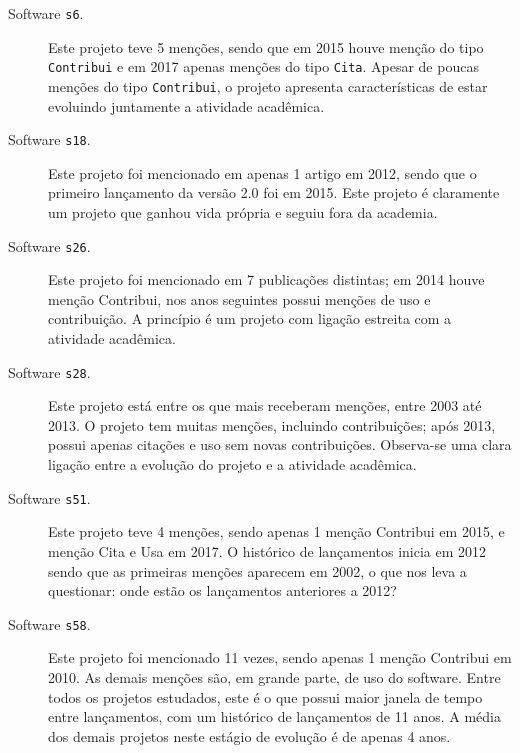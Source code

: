 
\begin{description}

  \item[Software \texttt{s6}.]
    Este projeto teve 5 menções, sendo que em 2015 houve menção do tipo \texttt{Contribui} 
    e em 2017 apenas menções do tipo \texttt{Cita}. 
    Apesar de poucas menções do tipo \texttt{Contribui},
    o projeto apresenta características de estar evoluindo juntamente a atividade
    acadêmica.

  \item[Software \texttt{s18}.]
    Este projeto foi mencionado em apenas 1 artigo em 2012, sendo que o
    primeiro lançamento da versão 2.0 foi em 2015. Este projeto é claramente um
    projeto que ganhou vida própria e seguiu fora da academia.

  \item[Software \texttt{s26}.]
    Este projeto foi mencionado em 7 publicações distintas; em 2014 houve
    menção Contribui, nos anos seguintes possui menções de uso e contribuição.
    A princípio é um projeto com ligação estreita com a atividade acadêmica.

  \item[Software \texttt{s28}.]
    Este projeto está entre os que mais receberam menções, entre 2003 até 2013.
    O projeto tem muitas menções, incluindo contribuições; após 2013, possui apenas
    citações e uso sem novas contribuições. Observa-se uma clara ligação
    entre a evolução do projeto e a atividade acadêmica.

  \item[Software \texttt{s51}.]
    Este projeto teve 4 menções, sendo apenas 1 menção Contribui em 2015,
    e menção Cita e Usa em 2017. O histórico de lançamentos inicia em 2012
    sendo que as primeiras menções aparecem em 2002, o que nos leva a
    questionar: onde estão os lançamentos anteriores a 2012?

  \item[Software \texttt{s58}.]
    Este projeto foi mencionado 11 vezes, sendo apenas 1 menção Contribui em 2010.
    As demais menções são, em grande parte, de uso do software. 
    Entre todos os projetos estudados, este é o que possui maior janela de tempo entre lançamentos, 
    com um histórico de lançamentos de 11 anos. A média dos demais  projetos neste estágio de evolução
    é de apenas 4 anos.

\end{description}

